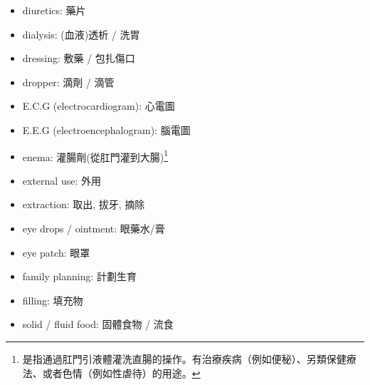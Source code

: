 \begin{multicols}{2}
\begin{itemize}
  \item diuretics: 藥片
  \item dialysis: (血液)透析 / 洗胃
  \item dressing: 敷藥 / 包扎傷口
  \item dropper: 滴劑 / 滴管
  \item E.C.G (electrocardiogram): 心電圖
  \item E.E.G (electroencephalogram): 腦電圖
  \item enema: 灌腸劑(從肛門灌到大腸)\footnote{是指通過肛門引液體灌洗直腸的操作。有治療疾病（例如便秘）、另類保健療法、或者色情（例如性虐待）的用途。}
  \item external use: 外用
  \item extraction: 取出, 拔牙, 摘除
  \item eye drops / ointment: 眼藥水/膏
  \item eye patch: 眼罩
  \item family planning: 計劃生育
  \item filling: 填充物
  \item solid / fluid food: 固體食物 / 流食
\end{itemize}
\end{multicols}

